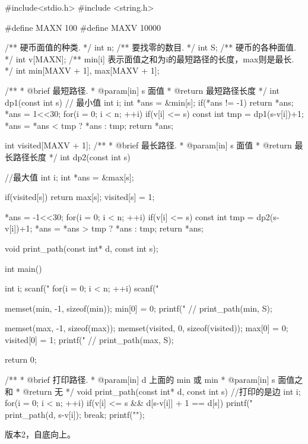 \begin{Codex}[label=coin_change.c]
#include<stdio.h>
#include <string.h>

#define MAXN 100
#define MAXV 10000

/** 硬币面值的种类. */
int n;
/** 要找零的数目. */
int S;
/** 硬币的各种面值. */
int v[MAXN];
/** min[i] 表示面值之和为i的最短路径的长度，max则是最长. */
int min[MAXV + 1], max[MAXV + 1];

/**
 * @brief 最短路径.
 * @param[in] s 面值
 * @return 最短路径长度
 */
int dp1(const int s) { // 最小值
    int i;
    int *ans = &min[s];
    if(*ans != -1) return *ans;
    *ans = 1<<30;
    for(i = 0; i < n; ++i) if(v[i] <= s) {
        const int tmp = dp1(s-v[i])+1;
        *ans = *ans < tmp ? *ans : tmp;
    }
    return *ans;
}

int visited[MAXV + 1];
/**
 * @brief 最长路径.
 * @param[in] s 面值
 * @return 最长路径长度
 */
int dp2(const int s) { //最大值 
    int i;
    int *ans = &max[s];

    if(visited[s]) return max[s];
    visited[s] = 1;

    *ans = -1<<30;
    for(i = 0; i < n; ++i) if(v[i] <= s) {
        const int tmp = dp2(s-v[i])+1;
        *ans = *ans > tmp ? *ans : tmp;
    }
    return *ans;
}

void print_path(const int* d, const int s);

int main() {
    int i;
    scanf("%
    for(i = 0; i < n; ++i) scanf("%

    memset(min, -1, sizeof(min));
    min[0] = 0;
    printf("%
    // print_path(min, S);

    memset(max, -1, sizeof(max));
    memset(visited, 0, sizeof(visited));
    max[0] = 0; visited[0] = 1;
    printf("%
    // print_path(max, S);

    return 0;
}

/**
 * @brief 打印路径.
 * @param[in] d 上面的 min 或 min
 * @param[in] s 面值之和
 * @return 无
 */
void print_path(const int* d, const int s) {//打印的是边
    int i;
    for(i = 0; i < n; ++i) if(v[i] <= s && d[s-v[i]] + 1 == d[s]) {
        printf("%
        print_path(d, s-v[i]);
        break;
    }
    printf("\n");
}
\end{Codex}

版本2，自底向上。

